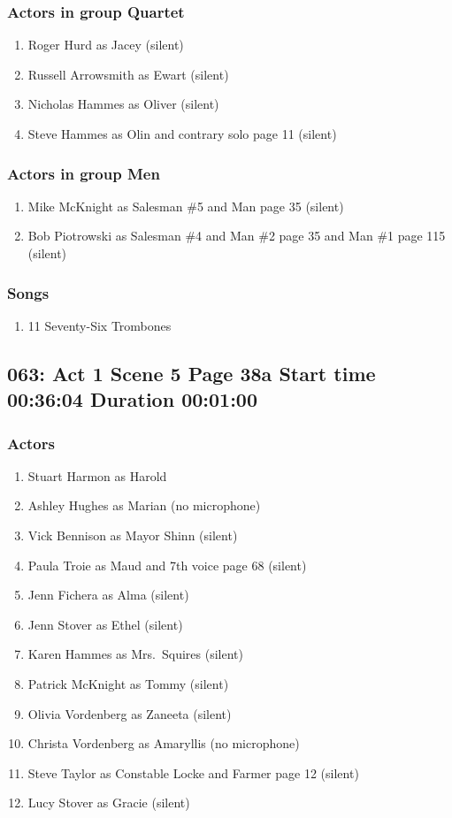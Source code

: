 \subsubsection{Actors in group Quartet}
\begin{enumerate}
\item Roger Hurd as Jacey (silent)
\item Russell Arrowsmith as Ewart (silent)
\item Nicholas Hammes as Oliver (silent)
\item Steve Hammes as Olin and contrary solo page 11 (silent)
\end{enumerate}
\subsubsection{Actors in group Men}
\begin{enumerate}
\item Mike McKnight as Salesman \#5 and Man page 35 (silent)
\item Bob Piotrowski as Salesman \#4 and Man \#2 page 35 and Man \#1 page 115 (silent)
\end{enumerate}

\subsubsection{Songs}
\begin{enumerate}
\item 11 Seventy-Six Trombones
\end{enumerate}
\subsection{063: Act 1 Scene 5 Page 38a Start time 00:36:04 Duration 00:01:00}

\subsubsection{Actors}
\begin{enumerate}
\item Stuart Harmon as Harold
\item Ashley Hughes as Marian (no microphone)
\item Vick Bennison as Mayor Shinn (silent)
\item Paula Troie as Maud and 7th voice page 68 (silent)
\item Jenn Fichera as Alma (silent)
\item Jenn Stover as Ethel (silent)
\item Karen Hammes as Mrs.~Squires (silent)
\item Patrick McKnight as Tommy (silent)
\item Olivia Vordenberg as Zaneeta (silent)
\item Christa Vordenberg as Amaryllis (no microphone)
\item Steve Taylor as Constable Locke and Farmer page 12 (silent)
\item Lucy Stover as Gracie (silent)
\end{enumerate}

